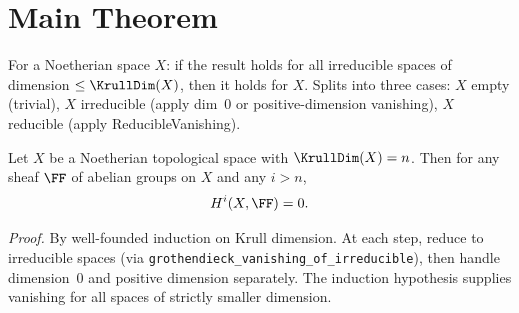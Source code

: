 \chapter{Main Theorem}\label{ch:main}

\begin{lemma}\label{lem:grothendieck_vanishing_of_irreducible}
  \leanok
  For a Noetherian space $X$: if the result holds for all irreducible spaces
  of dimension $\le \KrullDim(X)$, then it holds for $X$.
  Splits into three cases: $X$ empty (trivial), $X$ irreducible (apply
  dim~0 or positive-dimension vanishing), $X$ reducible (apply ReducibleVanishing).
\end{lemma}

\begin{theorem}\label{thm:GrothendieckVanishing}
  \leanok
  Let $X$ be a Noetherian topological space with $\KrullDim(X) = n$.
  Then for any sheaf $\FF$ of abelian groups on $X$ and any $i > n$,
  \[
    H^i(X, \FF) = 0.
  \]

  \emph{Proof.} By well-founded induction on Krull dimension.
  At each step, reduce to irreducible spaces
  (via \texttt{grothendieck\_vanishing\_of\_irreducible}), then handle
  dimension~0 and positive dimension separately. The induction hypothesis
  supplies vanishing for all spaces of strictly smaller dimension.
\end{theorem}
